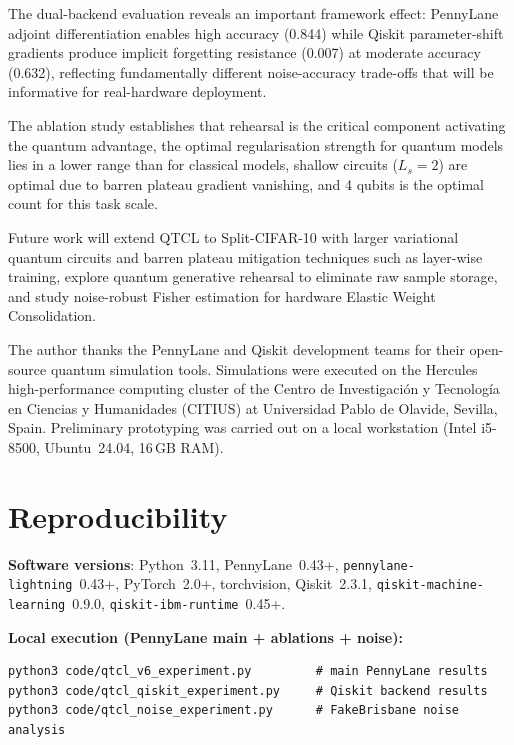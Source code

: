 \documentclass[a4paper,nopdfoutputerror]{quantumarticle}
\begin{document}
The dual-backend evaluation reveals an important framework effect:
PennyLane adjoint differentiation enables high accuracy (0.844) while Qiskit
parameter-shift gradients produce implicit forgetting resistance (0.007)
at moderate accuracy (0.632), reflecting fundamentally different noise-accuracy
trade-offs that will be informative for real-hardware deployment.

The ablation study establishes that rehearsal is the critical component
activating the quantum advantage, the optimal regularisation strength for
quantum models lies in a lower range than for classical models,
shallow circuits ($L_s=2$) are optimal due to barren plateau gradient vanishing,
and 4 qubits is the optimal count for this task scale.

Future work will extend QTCL to Split-CIFAR-10 with larger variational quantum
circuits and barren plateau mitigation techniques such as layer-wise training,
explore quantum generative rehearsal to eliminate raw sample storage, and study
noise-robust Fisher estimation for hardware Elastic Weight Consolidation.

\begin{acknowledgments}
The author thanks the PennyLane and Qiskit development teams for their
open-source quantum simulation tools.
Simulations were executed on the Hercules high-performance computing cluster
of the Centro de Investigación y Tecnología en Ciencias y Humanidades (CITIUS)
at Universidad Pablo de Olavide, Sevilla, Spain.
Preliminary prototyping was carried out on a local workstation (Intel i5-8500,
Ubuntu~24.04, 16\,GB RAM).
\end{acknowledgments}





\appendix

\section{Reproducibility}
\label{app:repro}

\textbf{Software versions}: Python~3.11, PennyLane~0.43+,
\texttt{pennylane-lightning}~0.43+, PyTorch~2.0+, torchvision,
Qiskit~2.3.1, \texttt{qiskit-machine-learning}~0.9.0,
\texttt{qiskit-ibm-runtime}~0.45+.

\noindent\textbf{Local execution (PennyLane main + ablations + noise):}
\begin{verbatim}
python3 code/qtcl_v6_experiment.py         # main PennyLane results
python3 code/qtcl_qiskit_experiment.py     # Qiskit backend results
python3 code/qtcl_noise_experiment.py      # FakeBrisbane noise analysis
\end{verbatim}
\end{document}
